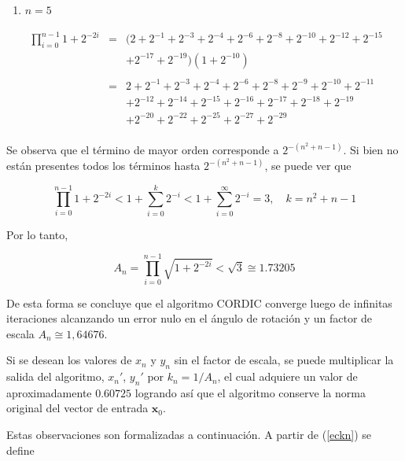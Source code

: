 \begin{enumerate}
\item $n=5$

\hspace{1cm}
\begin{math}
\begin{array}{lll}
\displaystyle\prod_{i=0}^{n-1}1+2^{-2i} & = & (2+2^{-1}+2^{-3}+2^{-4}+2^{-6}+2^{-8}+2^{-10}+2^{-12}+2^{-15}\\
		  			&   & +2^{-17}+2^{-19}) \left(1+2^{-10}\right)\\
		  	\\
		           & = & 2+2^{-1}+2^{-3}+2^{-4}+2^{-6}+2^{-8}+2^{-9}+2^{-10}+2^{-11}\\
                           &   & +2^{-12}+2^{-14}+2^{-15} +2^{-16}+2^{-17}+2^{-18}+2^{-19}\\
                           &   & +2^{-20}+2^{-22}+2^{-25}+2^{-27}+2^{-29}\\
\end{array}
\end{math}

\end{enumerate}

Se observa que el término de mayor orden corresponde a $2^{-\left(n^2+n-1 \right)}$. Si
bien no están presentes todos los términos hasta $2^{-\left(n^2+n-1 \right)}$, se
puede ver que 

\begin{equation}
\prod_{i=0}^{n-1} 1+2^{-2i}<1+\sum_{i=0}^{k}2^{-i}<1+\sum_{i=0}^{\infty}2^{-i}=3, \quad k=n^2+n-1
\end{equation}

Por lo tanto,

\begin{equation}
A_{n}=\prod_{i=0}^{n-1}\sqrt{1+2^{-2i}}<\sqrt{3}\cong 1.73205
\end{equation}

De esta forma se concluye que el algoritmo CORDIC converge luego de infinitas
iteraciones alcanzando un error nulo en el ángulo de rotación y un factor de escala $A_{n} \cong 1,64676$.

Si se desean los valores de $x_{n}$ y $y_{n}$ sin el factor de escala, se puede multiplicar la salida del algoritmo,
$x_{n}'$, $y_{n}'$ por $k_{n}=1/A_{n}$, el cual adquiere un valor de aproximadamente $0.60725$ logrando así que el
algoritmo conserve la norma original del vector de entrada $\mathbf{x}_0$.

Estas observaciones son formalizadas a continuación. A partir de (\ref{eckn}) se define

